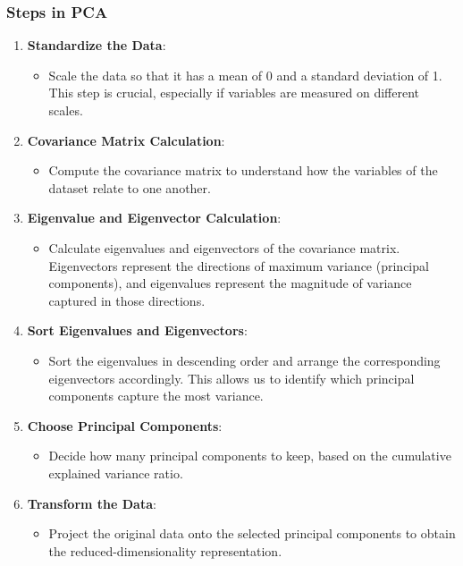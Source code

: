 \documentclass[12pt]{book}
\providecommand{\tightlist}{%
  \setlength{\itemsep}{0pt}\setlength{\parskip}{0pt}}
\begin{document}
\subsubsection{Steps in PCA}\label{steps-in-pca}

\begin{enumerate}
\def\labelenumi{\arabic{enumi}.}
\tightlist
\item
  \textbf{Standardize the Data}:

  \begin{itemize}
  \tightlist
  \item
    Scale the data so that it has a mean of 0 and a standard deviation
    of 1. This step is crucial, especially if variables are measured on
    different scales.
  \end{itemize}
\item
  \textbf{Covariance Matrix Calculation}:

  \begin{itemize}
  \tightlist
  \item
    Compute the covariance matrix to understand how the variables of the
    dataset relate to one another.
  \end{itemize}
\item
  \textbf{Eigenvalue and Eigenvector Calculation}:

  \begin{itemize}
  \tightlist
  \item
    Calculate eigenvalues and eigenvectors of the covariance matrix.
    Eigenvectors represent the directions of maximum variance (principal
    components), and eigenvalues represent the magnitude of variance
    captured in those directions.
  \end{itemize}
\item
  \textbf{Sort Eigenvalues and Eigenvectors}:

  \begin{itemize}
  \tightlist
  \item
    Sort the eigenvalues in descending order and arrange the
    corresponding eigenvectors accordingly. This allows us to identify
    which principal components capture the most variance.
  \end{itemize}
\item
  \textbf{Choose Principal Components}:

  \begin{itemize}
  \tightlist
  \item
    Decide how many principal components to keep, based on the
    cumulative explained variance ratio.
  \end{itemize}
\item
  \textbf{Transform the Data}:

  \begin{itemize}
  \tightlist
  \item
    Project the original data onto the selected principal components to
    obtain the reduced-dimensionality representation.
  \end{itemize}
\end{enumerate}
\end{document}
